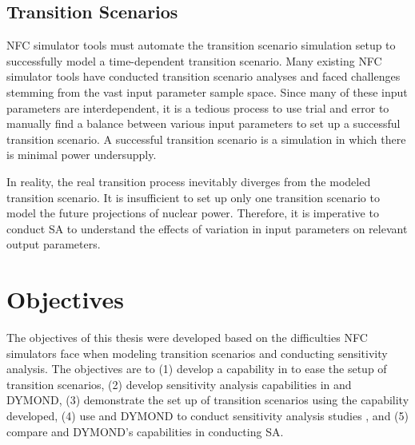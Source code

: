 \subsection{Transition Scenarios}
\gls{NFC} simulator tools must automate the transition scenario simulation 
setup to successfully model a time-dependent transition scenario. 
Many existing \gls{NFC} simulator tools have conducted 
transition scenario analyses 
\cite{feng_standardized_2016,bae_standardized_2019,coquelet-pascal_cosi6:_2015}
and faced challenges stemming from the vast input parameter
sample space.
Since many of these input parameters are interdependent, it is 
a tedious process to use trial and error to manually find a balance 
between various input parameters to set up a successful transition 
scenario. 
A successful transition scenario is a simulation in which there 
is minimal power undersupply.
 
In reality, the real transition process inevitably diverges
from the modeled transition scenario. 
It is insufficient to set up only one transition scenario to model 
the future projections of nuclear power.
Therefore, it is imperative to conduct \gls{SA} to understand 
the effects of variation in input parameters on 
relevant output parameters. 

\section{Objectives}
The objectives of this thesis were developed based on the difficulties 
\gls{NFC} simulators face when modeling transition scenarios 
and conducting sensitivity analysis.
The objectives are to 
(1) develop a capability in \Cyclus to ease the setup of 
transition scenarios, 
(2) develop sensitivity analysis capabilities in \Cyclus and DYMOND, 
(3) demonstrate the set up of \Cyclus transition scenarios using the 
capability developed,
(4) use \Cyclus and DYMOND to conduct sensitivity analysis studies
, and
(5) compare \Cyclus and DYMOND's capabilities in conducting \gls{SA}. 
